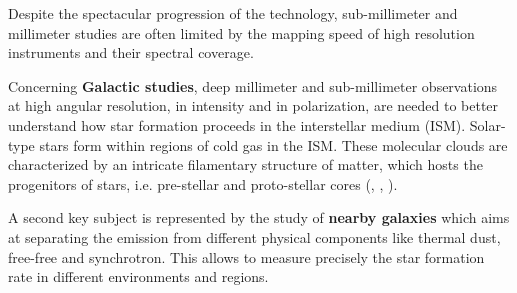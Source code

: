 \documentclass[]{aa} %
\begin{document}


Despite the spectacular progression of the technology, sub-millimeter and millimeter studies are often limited by the mapping speed of high resolution instruments and their spectral coverage. 

Concerning \textbf{Galactic studies}, deep millimeter and sub-millimeter observations at high angular resolution, in intensity and in polarization, are needed to better understand how star formation proceeds in the interstellar medium (ISM). Solar-type stars form within regions of cold gas in the ISM. These molecular clouds are characterized by an intricate filamentary structure of matter, which hosts the progenitors of stars, i.e. pre-stellar and proto-stellar cores (\cite{Andre2010}, \cite{Konyves2015}, \cite{Bracco2017}).

A second key subject is represented by the study of \textbf{nearby galaxies} which aims at separating the emission from different physical components like thermal dust, free-free and synchrotron. This allows to measure precisely the star formation rate in different environments and regions. 
\end{document}
